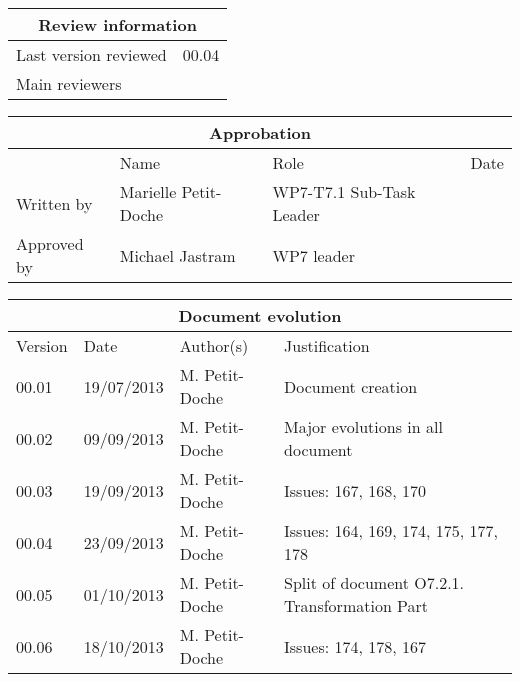 \documentclass{template/openetcs_report}
\begin{document}
\begin{tabular}{|p{4.4cm}|p{8.7cm}|}
\hline
\multicolumn{2}{|c|}{Review information} \\
\hline
Last version reviewed & 00.04 \\
\hline
Main reviewers &  \\
 
\hline
\end{tabular}

\begin{tabular}{|p{2.2cm}|p{4cm}|p{4cm}|p{2cm}|}
\hline
\multicolumn{4}{|c|}{Approbation} \\
\hline
  &  Name & Role & Date   \\
\hline  
Written by    &  Marielle Petit-Doche & WP7-T7.1 Sub-Task Leader  & \\
\hline
Approved by & Michael Jastram & WP7 leader & \\
\hline
\end{tabular}

\begin{tabular}{|p{2.2cm}|p{2cm}|p{3cm}|p{5cm}|}
\hline
\multicolumn{4}{|c|}{Document evolution} \\
\hline
Version &  Date & Author(s) & Justification  \\
\hline  
00.01 & 19/07/2013 & M. Petit-Doche &  Document creation  \\
00.02 & 09/09/2013 & M. Petit-Doche &  Major evolutions in all document  \\
00.03 & 19/09/2013 & M. Petit-Doche &  Issues: 167, 168, 170  \\
00.04 & 23/09/2013 & M. Petit-Doche &  Issues: 164, 169, 174, 175, 177, 178 \\
00.05 & 01/10/2013 & M. Petit-Doche &  Split of document O7.2.1. Transformation Part \\
00.06 & 18/10/2013 & M. Petit-Doche &  Issues: 174, 178, 167\\
\hline  
\end{tabular}



\newcommand{\tbd}{\colorbox{cyan}{\%\%To Be Defined\%\%}}
\newcommand{\tbc}{\colorbox{cyan}{\%\%To Be Confirmed\%\%}}
\newcommand{\todo}[1]{\colorbox{cyan}{\%\%{#1}\%\%}}
\newlength{\origindent}
\end{document}
